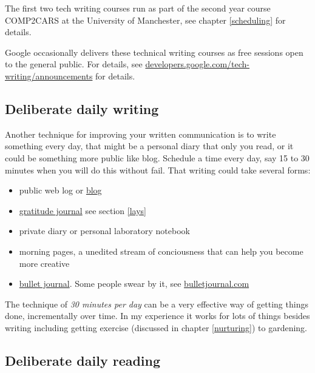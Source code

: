 \documentclass[
]{book}
\providecommand{\tightlist}{%
  \setlength{\itemsep}{0pt}\setlength{\parskip}{0pt}}
\begin{document}
The first two tech writing courses run as part of the second year course COMP2CARS at the University of Manchester, see chapter \ref{scheduling} for details.

Google occasionally delivers these technical writing courses as free sessions open to the general public. For details, see \href{https://developers.google.com/tech-writing/announcements}{developers.google.com/tech-writing/announcements} for details.

\hypertarget{dailywrite}{%
\subsection{Deliberate daily writing}\label{dailywrite}}

Another technique for improving your written communication is to write something every day, that might be a personal diary that only you read, or it could be something more public like blog. Schedule a time every day, say 15 to 30 minutes when you will do this without fail. That writing could take several forms:

\begin{itemize}
\tightlist
\item
  public web log or \href{https://en.wikipedia.org/wiki/Blog}{blog}
\item
  \href{https://en.wikipedia.org/wiki/Gratitude_journal}{gratitude journal} see section \ref{lays}
\item
  private diary or personal laboratory notebook
\item
  morning pages, a unedited stream of conciousness that can help you become more creative \citep{cameron, burkeman}
\item
  \href{https://en.wikipedia.org/wiki/Bullet_journal}{bullet journal}. Some people swear by it, see \href{https://bulletjournal.com/}{bulletjournal.com}
\end{itemize}

The technique of \emph{30 minutes per day} can be a very effective way of getting things done, incrementally over time. In my experience it works for lots of things besides writing including getting exercise (discussed in chapter \ref{nurturing}) to gardening. \citep{leendertz}

\hypertarget{dailyread}{%
\subsection{Deliberate daily reading}\label{dailyread}}
\end{document}
